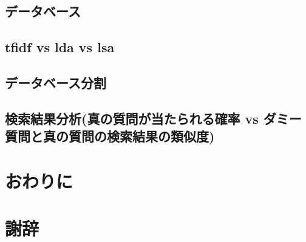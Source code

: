 \documentclass[master]{suribt}
\begin{document}
 \section{データベース}
 \section{tfidf vs lda vs lsa}
 \section{データベース分割}
 \section{検索結果分析(真の質問が当たられる確率 vs ダミー質問と真の質問の検索結果の類似度)}
 \chapter{おわりに}

 \backmatter%
 \chapter{謝辞}%


  \appendix%
  \chapter{}
  
\end{document}
